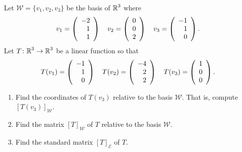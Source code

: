 \documentclass{ximera}
\author{Matthew Carr \& Marty Golubitsky}
\begin{document}
\begin{exercise}\label{mc.exerciseErr3}
Let $\mathcal{W} = \{v_1,v_2,v_3\}$ be the basis of $\mbox{$\Bbb{R}$}^3$ where
\[
v_1=\left(\begin{array}{rrrrrrrrrrrrrrrrrr} -2 \\ 1 \\ 1 \end{array}\right) \quad v_2=\left(\begin{array}{rrrrrrrrrrrrrrrrrr} 0 \\ 0 \\ 2 \end{array}\right) \quad v_3=\left(\begin{array}{rrrrrrrrrrrrrrrrrr} -1 \\ 1 \\ 0 \end{array}\right).
\]
Let  $T\colon \mbox{$\Bbb{R}$}^3\rightarrow\mbox{$\Bbb{R}$}^3$ be a linear function so that
\[
T(v_1)=\left(\begin{array}{rrrrrrrrrrrrrrrrrr} -1 \\ 1 \\ 0 \end{array}\right) \quad T(v_2)=\left(\begin{array}{rrrrrrrrrrrrrrrrrr} -4 \\ 2 \\ 2 \end{array}\right)  \quad T(v_3)=\left(\begin{array}{rrrrrrrrrrrrrrrrrr} 1 \\ 0 \\ 0 \end{array}\right).
\]
\begin{enumerate}[label=(\alph*)]
\item Find the coordinates of $T(v_3)$ relative to the basis $\mathcal{W}$. That is, compute $[T(v_3)]_\mathcal{W}$.
\item Find the  matrix $[T]_\mathcal{W}$ of $T$ relative to the basis $\mathcal{W}$.
\item Find the standard matrix $[T]_{\mathcal{E}}$ of $T$. 
\end{enumerate}


\end{exercise}
\end{document}
